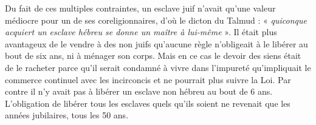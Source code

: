  Du fait de ces multiples contraintes, un esclave juif n'avait qu'une valeur médiocre pour un de ses coreligionnaires, d'où le dicton du Talmud : « \emph{quiconque acquiert un esclave hébreu se donne un maître à lui-même} ». Il était plus avantageux de le vendre à des non juifs qu'aucune règle n'obligeait à le libérer au bout de six ans, ni à ménager son corps. Mais en ce cas le devoir des siens était de le racheter parce qu'il serait condamné à vivre dans l'impureté qu'impliquait le commerce continuel avec les incirconcis et ne pourrait plus suivre la Loi. Par contre il n'y avait pas à libérer un esclave non hébreu au bout de 6 ans. L'obligation de libérer tous les esclaves quels qu'ils soient ne revenait que les années jubilaires, tous les 50 ans.

